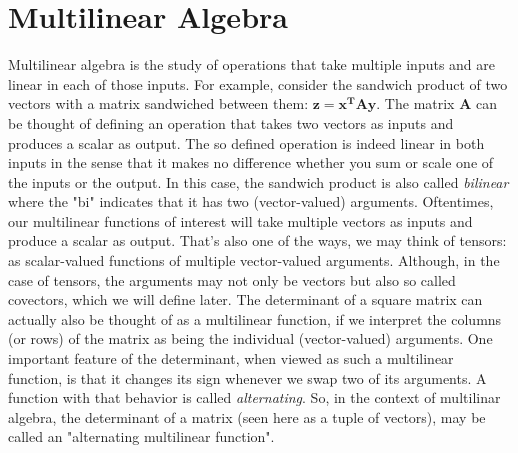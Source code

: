 \chapter{Multilinear Algebra}
Multilinear algebra is the study of operations that take multiple inputs and are linear in each of those inputs. For example, consider the sandwich product of two vectors with a matrix sandwiched between them: $\mathbf{z = x^T A y}$. The matrix $\mathbf{A}$ can be thought of defining an operation that takes two vectors as inputs and produces a scalar as output. The so defined operation is indeed linear in both inputs in the sense that it makes no difference whether you sum or scale one of the inputs or the output. In this case, the sandwich product is also called \emph{bilinear} where the "bi" indicates that it has two (vector-valued) arguments. Oftentimes, our multilinear functions of interest will take multiple vectors as inputs and produce a scalar as output. That's also one of the ways, we may think of tensors: as scalar-valued functions of multiple vector-valued arguments. Although, in the case of tensors, the arguments may not only be vectors but also so called covectors, which we will define later. The determinant of a square matrix can actually also be thought of as a multilinear function, if we interpret the columns (or rows) of the matrix as being the individual (vector-valued) arguments. One important feature of the determinant, when viewed as such a multilinear function, is that it changes its sign whenever we swap two of its arguments. A function with that behavior is called \emph{alternating}. So, in the context of multilinar algebra, the determinant of a matrix (seen here as a tuple of vectors), may be called an "alternating multilinear function".


\begin{comment}
-explain how the determinant is an alternating multilinear function in the columns
 (or rows) of a square matrix. That means, the columns of the matrix are taken as
 the individual inputs.
-explain, how covectors can be used to "measure" the length of a vector in an 
 arbitrary coordinate system and how this relates to the old scalar product.
-explain recripcoal frames, biorthogonal bases
\end{comment}